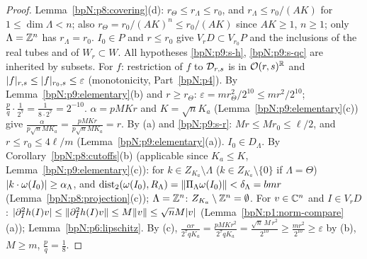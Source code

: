 \begin{proof}
\label{stepN:p9:bh-dom} Lemma~\ref{bpN:p8:covering}(d): $r_\Theta\le r_\Lambda\le r_0$, and $r_\Lambda\le r_0/(AK)$ for $1\le\dim\Lambda<n$; also $r_\Theta=r_0/(AK)^n\le r_0/(AK)$ since $AK\ge1$, $n\ge1$; only $\Lambda=\mathbb{Z}^n$ has $r_\Lambda=r_0$. $I_0\in P$ and $r\le r_0$ give $V_rD\subset V_{r_0}P$ and the inclusions of the real tubes and of $W_r\subset W$. All hypotheses \ref{bpN:p9:s-h}, \ref{bpN:p9:s-qc} are inherited by subsets. For $f$: restriction of $f$ to $\mathcal D_{r,s}$ is in $\mathcal O(r,s)^{\mathbb{R}}$ and $\lvert f\rvert_{r,s}\le\lvert f\rvert_{r_0,s}\le\varepsilon$ (monotonicity, Part~\ref{bpN:p4}).
\label{stepN:p9:bh-eps} By Lemma~\ref{bpN:p9:elementary}(b) and $r\ge r_\Theta$: $\varepsilon=mr_\Theta^2/2^{10}\le mr^2/2^{10}$; $\frac pq\cdot\frac1{2^7}=\frac1{8\cdot2^7}=2^{-10}$.
\label{stepN:p9:bh-rad} $\alpha=pMKr$ and $K=\sqrt nK_a$ (Lemma~\ref{bpN:p9:elementary}(c)) give $\frac\alpha{p\sqrt nMK_a}=\frac{pMKr}{p\sqrt nMK_a}=r$. By (a) and \ref{bpN:p9:s-r}: $Mr\le Mr_0\le\ell/2$, and $r\le r_0\le4\ell/m$ (Lemma~\ref{bpN:p9:elementary}(a)).
\label{stepN:p9:bh-nr} $I_0\in D_\Lambda$. By Corollary~\ref{bpN:p8:cutoffs}(b) (applicable since $K_a\le K$, Lemma~\ref{bpN:p9:elementary}(c)): for $k\in Z_{K_a}\setminus\Lambda$ ($k\in Z_{K_a}\setminus\{0\}$ if $\Lambda=\Theta$) $\lvert k\cdot\omega(I_0)\rvert\ge\alpha_\Lambda$, and $\operatorname{dist}_2(\omega(I_0),R_\Lambda)=\lVert \Pi_\Lambda\omega(I_0)\rVert<\delta_\Lambda=bmr$ (Lemma~\ref{bpN:p8:projection}(c)); $\Lambda=\mathbb{Z}^n$: $Z_{K_a}\setminus\mathbb{Z}^n=\emptyset$.
\label{stepN:p9:bh-lip} For $v\in\mathbb{C}^n$ and $I\in V_rD$: $\lvert \partial_I^2h(I)v\rvert\le\lVert \partial_I^2h(I)v\rVert\le M\lVert v\rVert\le\sqrt nM\lvert v\rvert$ (Lemma~\ref{bpN:p1:norm-compare}(a)); Lemma~\ref{bpN:p6:lipschitz}.
\label{stepN:p9:bh-small} By (c), $\frac{\alpha r}{2^7qK_a}=\frac{pMKr^2}{2^7qK_a}=\frac{\sqrt n\,M\,r^2}{2^{10}}\ge\frac{mr^2}{2^{10}}\ge\varepsilon$ by (b), $M\ge m$, $\frac pq=\frac18$.
\end{proof}

